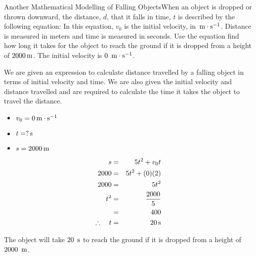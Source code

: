 \begin{wex}{Another Mathematical Modelling of Falling Objects}{When an object is dropped or thrown downward, the distance, $d$, that it falls in time, $t$ is described by the following equation:
In this equation, $v_0$ is the initial velocity, in $\,\mathrm{m \cdot s^{-1}}$. Distance is measured in meters and time is measured in seconds. Use the equation find how long it takes for the object to reach the ground if it is dropped from a height of $2000\,\rm{m}$. The initial velocity is $0~\,\mathrm{m \cdot s^{-1}}$.}
{
We are given an expression to calculate distance travelled by a falling object in terms of initial velocity and time. We are also given the initial velocity and distance travelled and are required to calculate the time it takes the object to travel the distance.

\begin{itemize}
\item $v_0 = 0\,\mathrm{m \cdot s^{-1}}$
\item $t = ?\,\mathrm{s}$
\item $s = 2000\,\rm{m}$
\end{itemize}

\begin{eqnarray*}
s &=& 5t^2 + v_0t\\
2000&=&5t^2+(0)(2)\\
2000&=&5t^2\\
t^2&=&\frac{2000}{5}\\
&=&400\\
\therefore\quad t&=&20\,\mathrm{s}
\end{eqnarray*}

The object will take $20~\,\mathrm{s}$ to reach the ground if it is dropped from a height of $2000~\,\rm{m}$.}
\end{wex}


